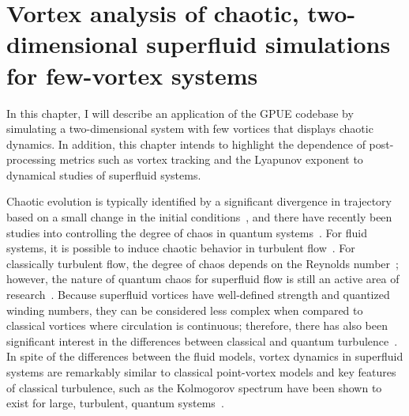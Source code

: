 \chapter{Vortex analysis of chaotic, two-dimensional superfluid simulations for few-vortex systems}
\label{ch:2d}

In this chapter, I will describe an application of the GPUE codebase by simulating a two-dimensional system with few vortices that displays chaotic dynamics.
In addition, this chapter intends to highlight the dependence of post-processing metrics such as vortex tracking and the Lyapunov exponent to dynamical studies of superfluid systems.

Chaotic evolution is typically identified by a significant divergence in trajectory based on a small change in the initial conditions~\cite{strogatz2018}, and there have recently been studies into controlling the degree of chaos in quantum systems~\cite{eastman2017, eastman2019}.
For fluid systems, it is possible to induce chaotic behavior in turbulent flow~\cite{spiegel1987, biferale2005}.
For classically turbulent flow, the degree of chaos depends on the Reynolds number~\cite{berera2018}; however, the nature of quantum chaos for superfluid flow is still an active area of research~\cite{white2014}.
Because superfluid vortices have well-defined strength and quantized winding numbers, they can be considered less complex when compared to classical vortices where circulation is continuous; therefore, there has also been significant interest in the differences between classical and quantum turbulence~\cite{nemirovskii1995,kyriakopoulos2014,koukouloyannis2014,navarro2013}.
In spite of the differences between the fluid models, vortex dynamics in superfluid systems are remarkably similar to classical point-vortex models and key features of classical turbulence, such as the Kolmogorov spectrum have been shown to exist for large, turbulent, quantum systems~\cite{nore1997,stalp1999,araki2002,salort2010}.

